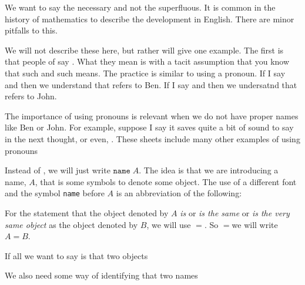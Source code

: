 
We want to say the necessary and not the superfluous.
It is common in the history of mathematics to describe the development in English.
There are minor pitfalls to this.

We will not describe these here, but rather will give one example.
The first is that people of say .
What they mean is  with a tacit assumption that you know that such and such means.
The practice is similar to using a pronoun.
If I say  and then  we understand that  refers to Ben.
If I say  and then  we undersatnd that  refers to John.

The importance of using pronouns is relevant when we do not have proper names like Ben or John.
For example, suppose I say  it saves quite a bit of sound to say  in the next thought, or even, .
These sheets include many other examples of using pronouns

Instead of , we will just write $\texttt{name} \; A$.
The idea is that we are introducing a name, $A$, that is some symbols to denote some object.
The use of a different font and the symbol \texttt{name} before $A$ is an abbreviation of the following: 

For the statement that the object denoted by $A$ \textit{is} or \textit{is the same} or \textit{is the very same object} as the object denoted by $B$, we will use $=$.
So $=$we will write $A = B$.

If all we want to say is that two objects

We also need some way of identifying that two names


\begin{account}
\end{account}

\begin{account}
\end{account}

\begin{account}
\end{account}

\blankpage

